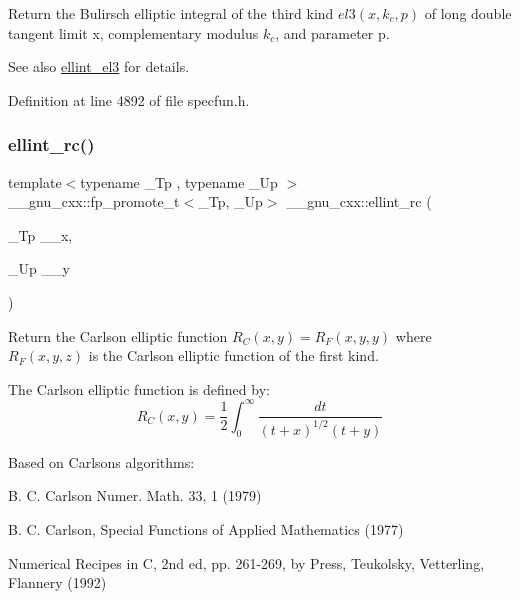 Return the Bulirsch elliptic integral of the third kind $ el3(x,k_c,p) $ of {\ttfamily long double} tangent limit {\ttfamily x}, complementary modulus $ k_c $, and parameter {\ttfamily p}.

\begin{DoxySeeAlso}{See also}
\hyperlink{group__mathsf__gnu_gaac07922e08fdf46cd509ff0cfa9ea1f0}{ellint\+\_\+el3} for details. 
\end{DoxySeeAlso}


Definition at line 4892 of file specfun.\+h.

\mbox{\label{group__mathsf__gnu_ga7d3d42f5f71a74266be8aaca528056bf}} 
\subsubsection{\texorpdfstring{ellint\+\_\+rc()}{ellint\_rc()}}
{\footnotesize\ttfamily template$<$typename \+\_\+\+Tp , typename \+\_\+\+Up $>$ \\
\+\_\+\+\_\+gnu\+\_\+cxx\+::fp\+\_\+promote\+\_\+t$<$\+\_\+\+Tp, \+\_\+\+Up$>$ \+\_\+\+\_\+gnu\+\_\+cxx\+::ellint\+\_\+rc (\begin{DoxyParamCaption}\item[{\+\_\+\+Tp}]{\+\_\+\+\_\+x,  }\item[{\+\_\+\+Up}]{\+\_\+\+\_\+y }\end{DoxyParamCaption})\hspace{0.3cm}{\ttfamily [inline]}}

Return the Carlson elliptic function $ R_C(x,y) = R_F(x,y,y) $ where $ R_F(x,y,z) $ is the Carlson elliptic function of the first kind.

The Carlson elliptic function is defined by\+: \[ R_C(x,y) = \frac{1}{2} \int_0^\infty \frac{dt}{(t + x)^{1/2}(t + y)} \]

Based on Carlson\textquotesingle{}s algorithms\+:
\begin{DoxyItemize}
\item B. C. Carlson Numer. Math. 33, 1 (1979)
\item B. C. Carlson, Special Functions of Applied Mathematics (1977)
\item Numerical Recipes in C, 2nd ed, pp. 261-\/269, by Press, Teukolsky, Vetterling, Flannery (1992)
\end{DoxyItemize}


